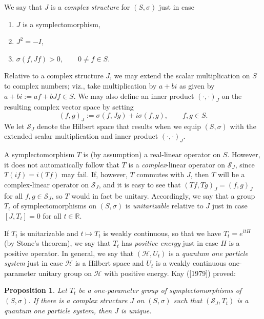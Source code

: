 \documentclass[12pt]{article}
\newtheorem{prop}{Proposition}
\theoremstyle{remark}
\theoremstyle{definition}
\newcommand{\hil}[1]{\mathcal{#1}}
\begin{document}
We say that $J$ is a \emph{complex structure} for $(S,\sigma )$ just
in case 
\begin{enumerate} 
\item $J$ is a symplectomorphism, 
\item $J^{2}=-I$,
\item $\sigma (f,Jf)> 0 , \qquad 0\not=f \in S$.
\end{enumerate}  
Relative to a complex structure $J$, we may extend the scalar
multiplication on $S$ to complex numbers; viz., take
multiplication by $a+bi$ as given by $a+bi:=af+bJf\in S$.  We may also define an
inner product $(\cdot ,\cdot )_{J}$ on the resulting complex vector
space by setting
\begin{equation} \label{eq:ip}
(f,g)_{J}:= \sigma (f,Jg)+i\sigma (f,g) , \qquad f,g\in S .\end{equation}
We let $\hil{S}_{J}$ denote the Hilbert space that results when we
equip $(S,\sigma)$ with the extended scalar multiplication 
and inner product $(\cdot ,\cdot )_{J}$.    

A symplectomorphism $T$ is (by assumption) a real-linear operator on
$S$.  However, it does not automatically follow that $T$ is a
\emph{complex}-linear operator on $\hil{S}_{J}$, since $T(if)=i(Tf)$
may fail.  If, however, $T$ commutes with $J$, then $T$ will be a
complex-linear operator on $\hil{S}_{J}$, and it is easy to see that
$(Tf,Tg)_{J}=(f,g)_{J}$ for all $f,g\in \hil{S}_{J}$, so $T$ would in fact be 
unitary.  Accordingly, we say that a group $T_{t}$
of symplectomorphisms on $(S,\sigma )$ is \emph{unitarizable} relative
to $J$ just in case $[J,T_{t}]=0$ for all $t\in \mathbb{R}$.  

If
$T_{t}$ is unitarizable and $t\mapsto T_{t}$ is weakly continuous,
so that we have $T_{t}=e^{itH}$ (by Stone's theorem), we say that $T_{t}$ has
\emph{positive energy} just in case $H$ is a positive operator.  In
general, we say that $(\hil{H},U_{t})$ is a \emph{quantum one
  particle system} just in case $\hil{H}$ is a Hilbert space and
$U_{t}$ is a weakly continuous one-parameter unitary group on
$\hil{H}$ with positive energy.  Kay ([1979]) proved:

\begin{prop}  Let $T_{t}$ be a one-parameter group of
  symplectomorphisms of $(S,\sigma )$.  If there is a complex
  structure $J$ on $(S,\sigma )$ such that $(\hil{S}_{J},T_{t})$ is a
  quantum one particle system, then $J$ is unique.  \label{kay} \end{prop}
  
\end{document}
